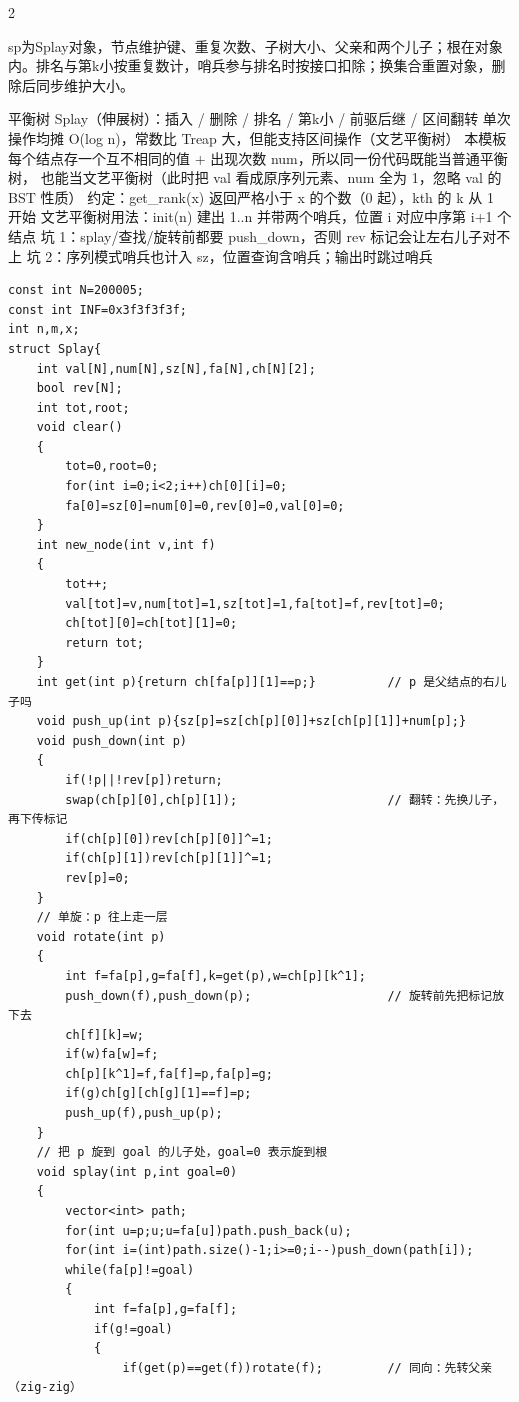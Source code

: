 \documentclass[UTF8,fontset=fandol,a4paper,twoside]{ctexart}
\newcommand{\note}[1]{{\fontsize{10}{12}\selectfont #1\par}}
\begin{document}
\begin{multicols}{2}
\note{sp为Splay对象，节点维护键、重复次数、子树大小、父亲和两个儿子；根在对象内。排名与第k小按重复数计，哨兵参与排名时按接口扣除；换集合重置对象，删除后同步维护大小。}
\note{平衡树 Splay（伸展树）：插入 /\allowbreak{} 删除 /\allowbreak{} 排名 /\allowbreak{} 第k小 /\allowbreak{} 前驱后继 /\allowbreak{} 区间翻转 单次操作均摊 O(\allowbreak{}log n)\allowbreak{}，常数比 Treap 大，但能支持区间操作（文艺平衡树） 本模板每个结点存一个互不相同的值 +\allowbreak{} 出现次数 num，所以同一份代码既能当普通平衡树， 也能当文艺平衡树（此时把 val 看成原序列元素、num 全为 1，忽略 val 的 BST 性质） 约定：get\_rank(\allowbreak{}x)\allowbreak{} 返回严格小于 x 的个数（0 起），kth 的 k 从 1 开始 文艺平衡树用法：init(\allowbreak{}n)\allowbreak{} 建出 1.\allowbreak{}.\allowbreak{}n 并带两个哨兵，位置 i 对应中序第 i+\allowbreak{}1 个结点 坑 1：splay/\allowbreak{}查找/\allowbreak{}旋转前都要 push\_down，否则 rev 标记会让左右儿子对不上 坑 2：序列模式哨兵也计入 sz，位置查询含哨兵；输出时跳过哨兵}
\begin{lstlisting}
const int N=200005;
const int INF=0x3f3f3f3f;
int n,m,x;
struct Splay{
    int val[N],num[N],sz[N],fa[N],ch[N][2];
    bool rev[N];
    int tot,root;
    void clear()
    {
        tot=0,root=0;
        for(int i=0;i<2;i++)ch[0][i]=0;
        fa[0]=sz[0]=num[0]=0,rev[0]=0,val[0]=0;
    }
    int new_node(int v,int f)
    {
        tot++;
        val[tot]=v,num[tot]=1,sz[tot]=1,fa[tot]=f,rev[tot]=0;
        ch[tot][0]=ch[tot][1]=0;
        return tot;
    }
    int get(int p){return ch[fa[p]][1]==p;}          // p 是父结点的右儿子吗
    void push_up(int p){sz[p]=sz[ch[p][0]]+sz[ch[p][1]]+num[p];}
    void push_down(int p)
    {
        if(!p||!rev[p])return;
        swap(ch[p][0],ch[p][1]);                     // 翻转：先换儿子，再下传标记
        if(ch[p][0])rev[ch[p][0]]^=1;
        if(ch[p][1])rev[ch[p][1]]^=1;
        rev[p]=0;
    }
    // 单旋：p 往上走一层
    void rotate(int p)
    {
        int f=fa[p],g=fa[f],k=get(p),w=ch[p][k^1];
        push_down(f),push_down(p);                   // 旋转前先把标记放下去
        ch[f][k]=w;
        if(w)fa[w]=f;
        ch[p][k^1]=f,fa[f]=p,fa[p]=g;
        if(g)ch[g][ch[g][1]==f]=p;
        push_up(f),push_up(p);
    }
    // 把 p 旋到 goal 的儿子处，goal=0 表示旋到根
    void splay(int p,int goal=0)
    {
        vector<int> path;
        for(int u=p;u;u=fa[u])path.push_back(u);
        for(int i=(int)path.size()-1;i>=0;i--)push_down(path[i]);
        while(fa[p]!=goal)
        {
            int f=fa[p],g=fa[f];
            if(g!=goal)
            {
                if(get(p)==get(f))rotate(f);         // 同向：先转父亲（zig-zig）

\end{lstlisting}
\end{multicols}
\end{document}
